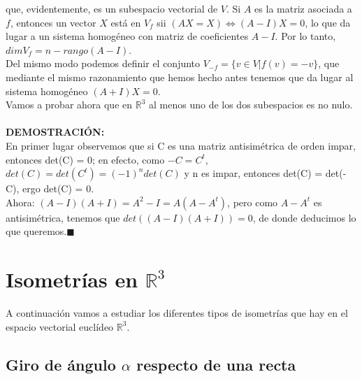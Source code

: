 \documentclass[10pt,a4paper]{article}
\theoremstyle{mystyle}
\newtheorem{prop}{\textcolor{green}{\textbf{Proposición}}}
\begin{document}
que, evidentemente, es un subespacio vectorial de $V$. Si $A$ es la matriz asociada a $f$, entonces un vector $X$ está en $V_f$ sii $(AX = X) \Longleftrightarrow (A-I)X = 0$, lo que da lugar a un sistema homogéneo con matriz de coeficientes $A-I$. Por lo tanto, $dim V_f = n - rango(A-I)$.\\

Del mismo modo podemos definir el conjunto $V_{-f} = \lbrace v \in V \vert f(v) = -v \rbrace$,  que mediante el mismo razonamiento que hemos hecho antes tenemos que da lugar al sistema homogéneo $(A+I)X = 0$.\\

Vamos a probar ahora que en $\mathbb{R}^3$ al menos uno de los dos subespacios es no nulo.\\

\hfill \\

\textbf{DEMOSTRACIÓN:}\\

En primer lugar observemos que si C es una matriz antisimétrica de orden impar, entonces det(C) = 0; en efecto, como $-C = C^t$, $det(C) = det(C^t) = (-1)^ndet(C)$ y n es impar, entonces det(C) = det(-C), ergo det(C) = 0.\\

Ahora: $(A-I)(A+I) = A^2 - I = A(A - A^t)$, pero como $A-A^t$ es antisimétrica, tenemos que $det((A-I)(A+I)) = 0$, de donde deducimos lo que queremos.$\blacksquare$\\

\section{Isometrías en $\mathbb{R}^3$}

A continuación vamos a estudiar los diferentes tipos de isometrías que hay en el espacio vectorial euclídeo $\mathbb{R}^3$.\\

\subsection{Giro de ángulo $\alpha$ respecto de una recta}
\end{document}
